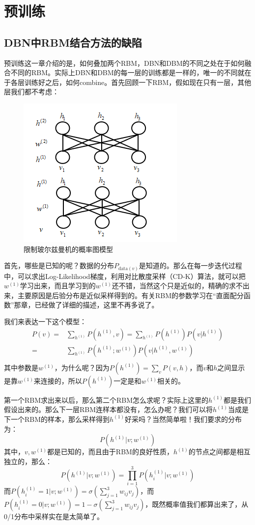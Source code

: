 \documentclass[a4paper]{article}
\begin{document}
\section{预训练}
\subsection{DBN中RBM结合方法的缺陷}
预训练这一章介绍的是，如何叠加两个RBM，DBN和DBM的不同之处在于如何融合不同的RBM。实际上DBN和DBM的每一层的训练都是一样的，唯一的不同就在于各层训练好之后，如何combine。首先回顾一下RBM，假如现在只有一层，其他层我们都不考虑：
\begin{figure}[H]
    \centering
    \includegraphics[width=.4\textwidth]{微信图片_20200523155106.png}
    \caption{限制玻尔兹曼机的概率图模型}
    \label{fig:my_label_1}
\end{figure}
首先，哪些是已知的呢？数据的分布$P_{\text{data}(v)}$是知道的。那么在每一步迭代过程中，可以求出Log-Likelihood梯度，利用对比散度采样（CD-K）算法，就可以把$w^{(1)}$学习出来，而且学习到的$w^{(1)}$还不错，当然这个只是近似的，精确的求不出来，主要原因是后验分布是近似采样得到的。有关RBM的参数学习在“直面配分函数”那章，已经做了详细的描述，这里不再多说了。

我们来表达一下这个模型：
\begin{equation}
    \begin{split}
        P(v) = & \sum_{h^{(1)}} P(h^{(1)},v) = \sum_{h^{(1)}} P(h^{(1)})P(v|h^{(1)}) \\
        = & \sum_{h^{(1)}} P(h^{(1)};w^{(1)})P(v|h^{(1)},w^{(1)}) \\
    \end{split}
\end{equation}
其中参数是$w^{(1)}$，为什么呢？因为$P(h^{(1)}) = \sum_v P(v,h)$，而$v$和$h$之间显示是靠$w^{(1)}$来连接的，所以$P(h^{(1)})$一定是和$w^{(1)}$相关的。

第一个RBM求出来以后，那么第二个RBM怎么求呢？实际上这里的$h^{(1)}$都是我们假设出来的。那么下一层RBM连样本都没有，怎么办呢？我们可以将$h^{(1)}$当成是下一个RBM的样本，那么采样得到$h^{(1)}$好采吗？当然简单啦！我们要求的分布为：
$$
P(h^{(1)}|v;w^{(1)})
$$
其中，$v,w^{(1)}$都是已知的，而且由于RBM的良好性质，$h^{(1)}$的节点之间都是相互独立的，那么：
\begin{equation}
    P(h^{(1)}|v;w^{(1)}) = \prod_{i=1}^3 P(h^{(1)}_i|v;w^{(1)})
\end{equation}
而$P(h^{(1)}_i=1|v;w^{(1)}) = \sigma(\sum_{j=1}^3 w_{ij}v_j)$，而$P(h^{(1)}_i=0|v;w^{(1)}) = 1 -  \sigma(\sum_{j=1}^3 w_{ij}v_j)$，既然概率值我们都算出来了，从0/1分布中采样实在是太简单了。
\end{document}

